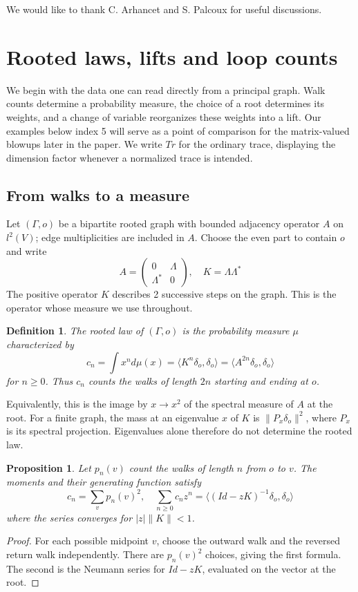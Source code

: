 \documentclass[11pt,reqno]{amsart}
\newtheorem{prop}[thm]{Proposition}
\newtheorem{defi}[thm]{Definition}
\theoremstyle{definition}
\numberwithin{equation}{section}
\begin{document}
\medskip

 We would like to thank C. Arhancet and S. Palcoux for useful discussions.

\section{Rooted laws, lifts and loop counts}\label{sec:prelim}

We begin with the data one can read directly from a principal graph. Walk counts determine a probability measure, the choice of a root determines its weights, and a change of variable reorganizes these weights into a lift. Our examples below index 5 will serve as a point of comparison for the matrix-valued blowups later in the paper. We write $Tr$ for the ordinary trace, displaying the dimension factor whenever a normalized trace is intended.

\subsection{From walks to a measure}

Let $(\Gamma,o)$ be a bipartite rooted graph with bounded adjacency operator $A$ on $l^2(V)$; edge multiplicities are included in $A$. Choose the even part to contain $o$ and write
$$A=\begin{pmatrix}0&\Lambda\\\Lambda^*&0\end{pmatrix},\quad K=\Lambda\Lambda^*$$
The positive operator $K$ describes 2 successive steps on the graph. This is the operator whose measure we use throughout.

\begin{defi}
The rooted law of $(\Gamma,o)$ is the probability measure $\mu$ characterized by
$$c_n=\int x^nd\mu(x)=\langle K^n\delta_o,\delta_o\rangle=\langle A^{2n}\delta_o,\delta_o\rangle$$
for $n\geq0$. Thus $c_n$ counts the walks of length $2n$ starting and ending at $o$.
\end{defi}

Equivalently, this is the image by $x\to x^2$ of the spectral measure of $A$ at the root. For a finite graph, the mass at an eigenvalue $x$ of $K$ is $\|P_x\delta_o\|^2$, where $P_x$ is its spectral projection. Eigenvalues alone therefore do not determine the rooted law.

\begin{prop}\label{prop:midpoint}
Let $p_n(v)$ count the walks of length $n$ from $o$ to $v$. The moments and their generating function satisfy
$$c_n=\sum_vp_n(v)^2,\quad \sum_{n\geq0}c_nz^n=\langle(Id-zK)^{-1}\delta_o,\delta_o\rangle$$
where the series converges for $|z|\|K\|<1$.
\end{prop}
\begin{proof}
For each possible midpoint $v$, choose the outward walk and the reversed return walk independently. There are $p_n(v)^2$ choices, giving the first formula. The second is the Neumann series for $Id-zK$, evaluated on the vector at the root.
\end{proof}
\end{document}
